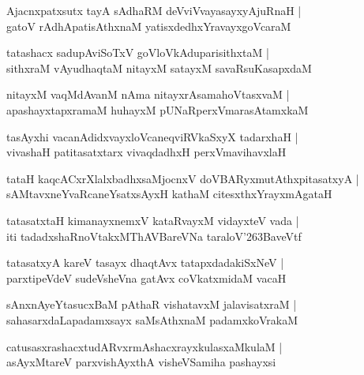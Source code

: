 \documentclass[twoside,12pt,openright]{book}
\def\S{\char'263}
\newcounter{shloka}[chapter]
\begin{document}
\begin{shloka}%
Ajacnxpatxsutx tayA sAdhaRM deVviVvayasayxyAjuRnaH |\\
gatoV rAdhApatisAthxnaM yatisxdedhxYravayxgoVcaraM 
\end{shloka}

\begin{shloka}%
tatashacx sadupAviSoTxV goVloVkAduparisithxtaM |\\
sithxraM vAyudhaqtaM nitayxM satayxM savaRsuKasapxdaM 
\end{shloka}

\begin{shloka}%
nitayxM vaqMdAvanM nAma nitayxrAsamahoVtasxvaM |\\
apashayxtapxramaM huhayxM pUNaRperxVmarasAtamxkaM 
\end{shloka}

\begin{shloka}%
tasAyxhi vacanAdidxvayxloVcaneqviRVkaSxyX tadarxhaH |\\
vivashaH patitasatxtarx vivaqdadhxH perxVmavihavxlaH 
\end{shloka}

\begin{shloka}%
tataH kaqcACxrXlalxbadhxsaMjocnxV doVBARyxmutAthxpitasatxyA |\\
sAMtavxneYvaRcaneYsatxsAyxH kathaM citesxthxYrayxmAgataH 
\end{shloka}

\begin{shloka}%
tatasatxtaH kimanayxnemxV kataRvayxM vidayxteV vada |\\
iti tadadxshaRnoVtakxMThAVBareVNa taraloV\S BaveVtf 
\end{shloka}

\begin{shloka}%
tatasatxyA kareV tasayx dhaqtAvx tatapxdadakiSxNeV |\\
parxtipeVdeV sudeVsheVna gatAvx coVkatxmidaM vacaH
\end{shloka}

\begin{shloka}%
sAnxnAyeYtasucxBaM pAthaR vishatavxM jalavisatxraM |\\
sahasarxdaLapadamxsayx saMsAthxnaM padamxkoVrakaM 
\end{shloka}

\begin{shloka}%
catusasxrashacxtudARvxrmAshacxrayxkulasxaMkulaM |\\
asAyxMtareV parxvishAyxthA visheVSamiha pashayxsi 
\end{shloka}
\end{document}
